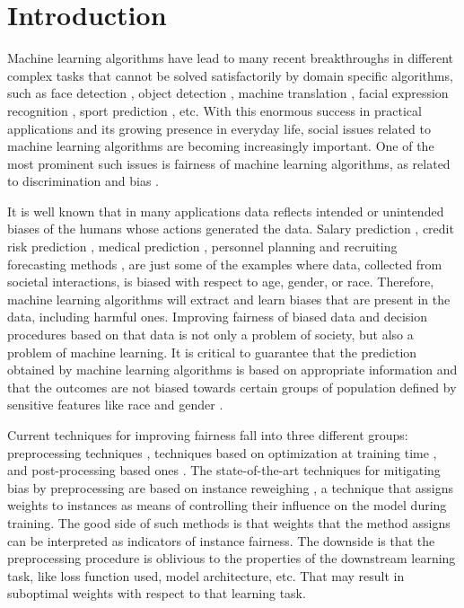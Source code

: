\documentclass[preprint,12pt]{elsarticle}
\begin{document}

\section{Introduction}
\label{Sec:Introduction}
Machine learning algorithms have lead to many recent breakthroughs in different complex tasks that cannot be solved satisfactorily by domain specific algorithms, such as face detection \cite{kumar2019face}, object detection \cite{voulodimos2018deep}, machine translation \cite{singh2017machine}, facial expression recognition
\cite{domadiya2019review}, sport prediction \cite{bunker2019machine}, etc. With this enormous success in practical applications and its growing presence in everyday life, social issues related to machine learning algorithms are becoming increasingly important. One of the most prominent such issues is fairness of machine learning algorithms, as related to discrimination and bias \cite{hajian2016algorithmic}.

It is well known that in many applications data reflects intended or unintended biases of the humans whose actions generated the data. Salary prediction \cite{innocenti2016mining}, credit risk prediction \cite{li2019credit}, medical prediction \cite{boyd1996relationship}, personnel planning and recruiting forecasting methods \cite{kim2016data}, are just some of the examples where data, collected from societal interactions, is biased with respect to age, gender, or race. Therefore, machine learning algorithms will extract and learn biases that are present in the data, including harmful ones.
Improving fairness of biased data and decision procedures based on that data is not only a problem of society, but also a problem of machine learning.  It is critical to guarantee that the prediction obtained by machine learning algorithms is based on appropriate information and that the outcomes are not biased towards certain groups of population defined by sensitive features like race and gender \cite{wang2019approaching}.

Current techniques for improving fairness fall into three different groups: preprocessing techniques \cite{kamiran2012decision,calmon2017optimized}, techniques based on optimization at training time \cite{zafar2019fairness,adel2019one,celis2019classification,kamishima2012fairness}, and post-processing based ones \cite{hardt2016equality, pleiss2017fairness}. The state-of-the-art techniques for mitigating bias by preprocessing are based on instance reweighing \cite{kamiran2012data}, a technique that assigns weights to instances as means of controlling their influence on the model during training. The good side of such methods is that weights that the method assigns can be interpreted as indicators of instance fairness. The downside is that the preprocessing procedure is oblivious to
the properties of the downstream learning task, like loss function used, model architecture, etc. That may result in suboptimal weights with respect to that learning task.
\end{document}

